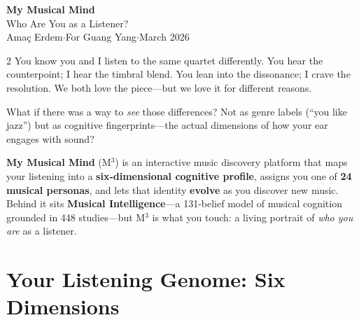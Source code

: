 \documentclass[10pt,a4paper]{article}
\begin{document}
\begin{center}
  \vspace*{4pt}
  {\fontsize{24}{28}\selectfont\sffamily\bfseries\color{deep}
   My Musical Mind}\\[5pt]
  {\fontsize{11}{14}\selectfont\sffamily\color{accent!80!black}
   Who Are You as a Listener?}\\[14pt]
  {\normalsize\sffamily Ama\c{c} Erdem\quad$\cdot$\quad For Guang Yang\quad$\cdot$\quad March 2026}
\end{center}

\vspace{8pt}

\begin{introbox}
\begin{multicols}{2}
\small
You know you and I listen to the same quartet differently. You hear the counterpoint; I hear the timbral blend. You lean into the dissonance; I crave the resolution. We both love the piece---but we love it for different reasons.

\smallskip
What if there was a way to \emph{see} those differences? Not as genre labels (``you like jazz'') but as cognitive fingerprints---the actual dimensions of how your ear engages with sound?

\columnbreak

\textbf{My Musical Mind} (M$^3$) is an interactive music discovery platform that maps your listening into a \textbf{six-dimensional cognitive profile}, assigns you one of \textbf{24 musical personas}, and lets that identity \textbf{evolve} as you discover new music. Behind it sits \textbf{Musical Intelligence}---a 131-belief model of musical cognition grounded in 448 studies---but M$^3$ is what you touch: a living portrait of \emph{who you are} as a listener.

\end{multicols}
\end{introbox}

\section{Your Listening Genome: Six Dimensions}

\vspace{2pt}
\end{document}
